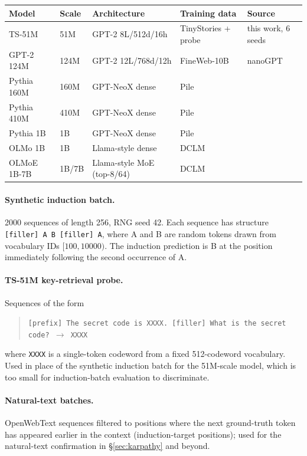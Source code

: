 \documentclass[11pt]{article}
\begin{document}
\begin{center}
\footnotesize
\setlength{\tabcolsep}{4pt}
\begin{tabular}{lllll}
\toprule
Model & Scale & Architecture & Training data & Source \\
\midrule
TS-51M      & 51M     & GPT-2 8L/512d/16h & TinyStories + probe & this work, 6 seeds \\
GPT-2 124M  & 124M    & GPT-2 12L/768d/12h & FineWeb-10B & nanoGPT \citep{karpathy2023nanogpt} \\
Pythia 160M & 160M    & GPT-NeoX dense & Pile & \citet{biderman2023pythia} \\
Pythia 410M & 410M    & GPT-NeoX dense & Pile & \citet{biderman2023pythia} \\
Pythia 1B   & 1B      & GPT-NeoX dense & Pile & \citet{biderman2023pythia} \\
OLMo 1B     & 1B      & Llama-style dense & DCLM & \citet{groeneveld2024olmo} \\
OLMoE 1B-7B & 1B/7B   & Llama-style MoE (top-8/64) & DCLM & \citet{muennighoff2024olmoe} \\
\bottomrule
\end{tabular}
\end{center}

\paragraph{Synthetic induction batch.} 2000 sequences of length 256, RNG seed 42. Each sequence has structure \texttt{[filler] A B [filler] A}, where A and B are random tokens drawn from vocabulary IDs $[100, 10000)$. The induction prediction is B at the position immediately following the second occurrence of A.

\paragraph{TS-51M key-retrieval probe.} Sequences of the form
\begin{quote}\small
\texttt{[prefix] The secret code is XXXX. [filler] What is the secret code? $\to$ XXXX}
\end{quote}
where \texttt{XXXX} is a single-token codeword from a fixed 512-codeword vocabulary. Used in place of the synthetic induction batch for the 51M-scale model, which is too small for induction-batch evaluation to discriminate.

\paragraph{Natural-text batches.} OpenWebText sequences filtered to positions where the next ground-truth token has appeared earlier in the context (induction-target positions); used for the natural-text confirmation in \S\ref{sec:karpathy} and beyond.
\end{document}
